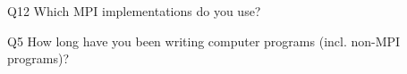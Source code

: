 \begin{description}%
\item{Q12} Which MPI implementations do you use?%
\item{Q5} How long have you been writing computer programs (incl. non-MPI programs)?%
\end{description}%
